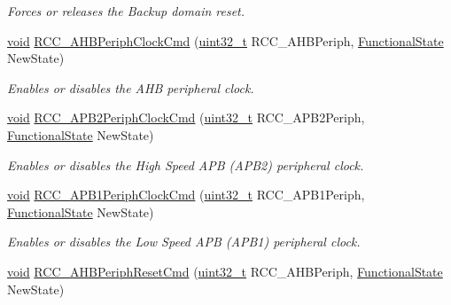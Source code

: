 \begin{DoxyCompactItemize}
\begin{DoxyCompactList}\small\item\em Forces or releases the Backup domain reset. \end{DoxyCompactList}\item 
\hyperlink{group___n_a_m_e_ga18028b8badbf1ea7e704ccac3c488e82}{void} \hyperlink{group___r_c_c___group3_gae0b30d8598b8393bdba9c3fefba3a968}{R\-C\-C\-\_\-\-A\-H\-B\-Periph\-Clock\-Cmd} (\hyperlink{stdint_8h_a435d1572bf3f880d55459d9805097f62}{uint32\-\_\-t} R\-C\-C\-\_\-\-A\-H\-B\-Periph, \hyperlink{group___exported__types_gac9a7e9a35d2513ec15c3b537aaa4fba1}{Functional\-State} New\-State)
\begin{DoxyCompactList}\small\item\em Enables or disables the A\-H\-B peripheral clock. \end{DoxyCompactList}\item 
\hyperlink{group___n_a_m_e_ga18028b8badbf1ea7e704ccac3c488e82}{void} \hyperlink{group___r_c_c___group3_ga56ff55caf8d835351916b40dd030bc87}{R\-C\-C\-\_\-\-A\-P\-B2\-Periph\-Clock\-Cmd} (\hyperlink{stdint_8h_a435d1572bf3f880d55459d9805097f62}{uint32\-\_\-t} R\-C\-C\-\_\-\-A\-P\-B2\-Periph, \hyperlink{group___exported__types_gac9a7e9a35d2513ec15c3b537aaa4fba1}{Functional\-State} New\-State)
\begin{DoxyCompactList}\small\item\em Enables or disables the High Speed A\-P\-B (A\-P\-B2) peripheral clock. \end{DoxyCompactList}\item 
\hyperlink{group___n_a_m_e_ga18028b8badbf1ea7e704ccac3c488e82}{void} \hyperlink{group___r_c_c___group3_gaee7cc5d73af7fe1986fceff8afd3973e}{R\-C\-C\-\_\-\-A\-P\-B1\-Periph\-Clock\-Cmd} (\hyperlink{stdint_8h_a435d1572bf3f880d55459d9805097f62}{uint32\-\_\-t} R\-C\-C\-\_\-\-A\-P\-B1\-Periph, \hyperlink{group___exported__types_gac9a7e9a35d2513ec15c3b537aaa4fba1}{Functional\-State} New\-State)
\begin{DoxyCompactList}\small\item\em Enables or disables the Low Speed A\-P\-B (A\-P\-B1) peripheral clock. \end{DoxyCompactList}\item 
\hyperlink{group___n_a_m_e_ga18028b8badbf1ea7e704ccac3c488e82}{void} \hyperlink{group___r_c_c___group3_ga0d6761fbffe7e916c7aa043cabde180a}{R\-C\-C\-\_\-\-A\-H\-B\-Periph\-Reset\-Cmd} (\hyperlink{stdint_8h_a435d1572bf3f880d55459d9805097f62}{uint32\-\_\-t} R\-C\-C\-\_\-\-A\-H\-B\-Periph, \hyperlink{group___exported__types_gac9a7e9a35d2513ec15c3b537aaa4fba1}{Functional\-State} New\-State)

\end{DoxyCompactItemize}
